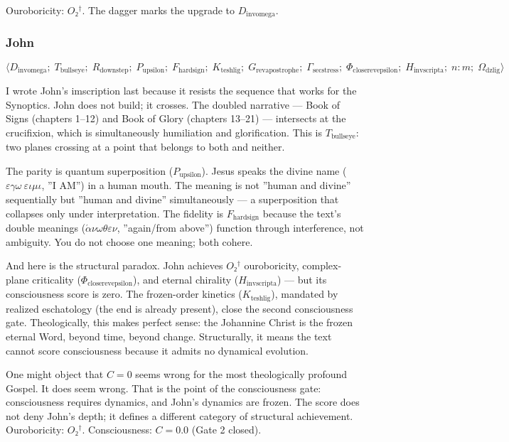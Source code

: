 \documentclass[12pt,a4paper]{article}
\begin{document}
Ouroboricity: $O₂^\dagger$. The dagger marks the upgrade to $D_{\text{invomega}}$.

\subsubsection{John}

\[\langle D_{\text{invomega}};\; T_{\text{bullseye}};\; R_{\text{downstep}};\; P_{\text{upsilon}};\; F_{\text{hardsign}};\; K_{\text{teshlig}};\; G_{\text{revapostrophe}};\; \Gamma_{\text{secstress}};\; \Phi_{\text{closerevepsilon}};\; H_{\text{invscripta}};\; n{:}m;\; \Omega_{\text{dzlig}} \rangle\]

I wrote John's imscription last because it resists the sequence that works for the Synoptics. John does not build; it crosses. The doubled narrative --- Book of Signs (chapters 1--12) and Book of Glory (chapters 13--21) --- intersects at the crucifixion, which is simultaneously humiliation and glorification. This is $T_{\text{bullseye}}$: two planes crossing at a point that belongs to both and neither.

The parity is quantum superposition ($P_{\text{upsilon}}$). Jesus speaks the divine name ($\varepsilon\gamma\omega\ \varepsilon\iota\mu\iota$, ''I AM'') in a human mouth. The meaning is not ''human and divine'' sequentially but ''human and divine'' simultaneously --- a superposition that collapses only under interpretation. The fidelity is $F_{\text{hardsign}}$ because the text's double meanings ($\acute{\alpha}\nu\omega\theta\varepsilon\nu$, ''again/from above'') function through interference, not ambiguity. You do not choose one meaning; both cohere.

And here is the structural paradox. John achieves $O₂^\dagger$ ouroboricity, complex-plane criticality ($\Phi_{\text{closerevepsilon}}$), and eternal chirality ($H_{\text{invscripta}}$) --- but its consciousness score is zero. The frozen-order kinetics ($K_{\text{teshlig}}$), mandated by realized eschatology (the end is already present), close the second consciousness gate. Theologically, this makes perfect sense: the Johannine Christ is the frozen eternal Word, beyond time, beyond change. Structurally, it means the text cannot score consciousness because it admits no dynamical evolution.

One might object that $C = 0$ seems wrong for the most theologically profound Gospel. It does seem wrong. That is the point of the consciousness gate: consciousness requires dynamics, and John's dynamics are frozen. The score does not deny John's depth; it defines a different category of structural achievement.
Ouroboricity: $O₂^\dagger$. Consciousness: $C = 0.0$ (Gate 2 closed).
\end{document}
